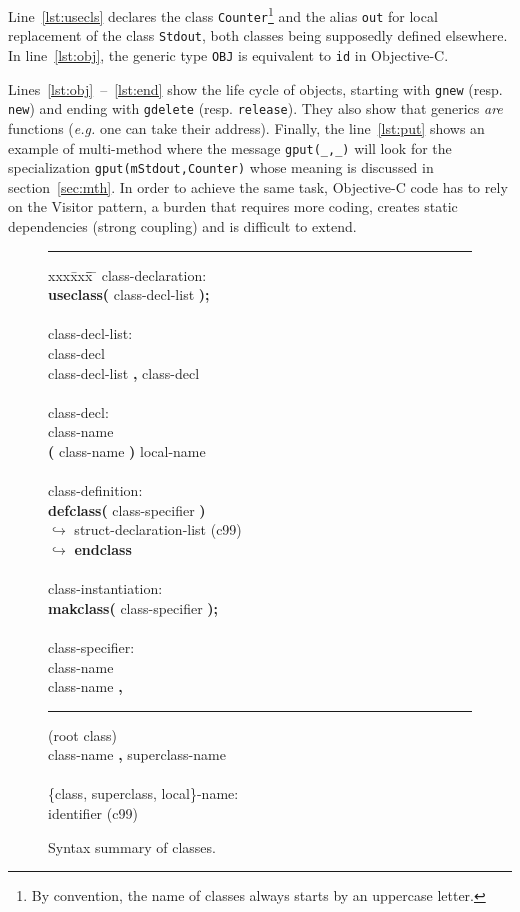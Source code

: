 \documentclass[preprint,10pt]{sigplanconf}
\newcommand{\abbrev}[1]{{\em #1}\xspace}
\newcommand{\eg}{\abbrev{e.g.}}
\newcommand{\ProgLang}[1]{{\sc #1}\xspace}
\newcommand{\Objc}      {\ProgLang{Objective-C}}
\newcommand{\ttb}[1]{{\normalfont\ttfamily\bfseries #1}}
\newcommand{\lnk}{\ensuremath{\hookrightarrow}\xspace}
\newcommand{\hr}{\rule{\columnwidth}{0.33pt}}
\newcommand{\code}[1]{\lstinline[language=COS,style=samplecode]|#1|}
\newcommand{\objcode}[1]{\lstinline[language=OBJC,style=samplecode]|#1|}
\begin{document}
Line~\ref{lst:usecls} declares the class \code{Counter}\footnote{By convention, the name of classes always starts by an uppercase letter.}  and the alias \code{out} for local replacement of the class \code{Stdout}, both classes being supposedly defined elsewhere.
In line~\ref{lst:obj}, the generic type \code{OBJ} is equivalent to \objcode{id} in \Objc.

\noindent
Lines~\ref{lst:obj}~--~\ref{lst:end} show the life cycle of objects, starting with \code{gnew} (resp. \code{new}) and ending with \code{gdelete} (resp. \code{release}). They also show that generics {\em are} functions (\eg one can take their address). Finally, the line~\ref{lst:put} shows an example of multi-method where the message \code{gput(_,_)} will look for the specialization \code{gput(mStdout,Counter)} whose meaning is discussed in section~\ref{sec:mth}. In order to achieve the same task, \Objc code has to rely on the Visitor pattern, a burden that requires more coding, creates static dependencies (strong coupling) and is difficult to extend.

\begin{figure}\hr
\begin{center}
{\em
\begin{tabbing}
xxx\= xxx\= \hspace*{17em}\= \hspace*{2em} \= \kill
class-declaration: \\
\> \ttb{useclass(} class-decl-list \ttb{);} \\
\\
class-decl-list: \\
\> class-decl \\
\> class-decl-list \ttb{,} class-decl \\
\\
class-decl: \\
\> class-name \\
\> \ttb{(} class-name \ttb{)} local-name \\
\\
class-definition: \\
\> \ttb{defclass(} class-specifier \ttb{)} \\ \lnk
\> \> struct-declaration-list		\>\> (c99) \\ \lnk
\> \ttb{endclass} \\
\\
class-instantiation: \\
\> \ttb{makclass(} class-specifier \ttb{);} \\
\\
class-specifier: \\
\> class-name \\
\> class-name \ttb{,} \rule{1.5ex}{1pt} \>\> (root class) \\
\> class-name \ttb{,} superclass-name \\
\\
\{class, superclass, local\}-name: \\
\> identifier					\>\>\> (c99)
\end{tabbing}
}
\end{center}
\caption{Syntax summary of classes.\label{fig:clsgram}}
\end{figure}
\end{document}
